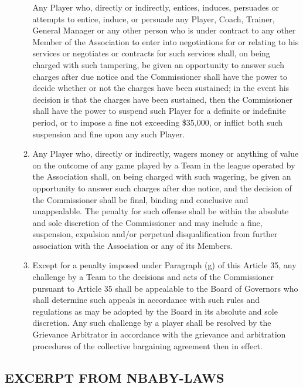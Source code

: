\documentclass[
]{book}
\begin{document}
\begin{enumerate}
\begin{enumerate}
    Any Player who, directly or indirectly, entices, induces, persuades or attempts to entice, induce, or persuade any Player, Coach, Trainer, General Manager or any other person who is under contract to any other Member of the Association to enter into negotiations for or relating to his services or negotiates or contracts for such services shall, on being charged with such tampering, be given an opportunity to answer such charges after due notice and the Commissioner shall have the power to decide whether or not the charges have been sustained; in the event his decision is that the charges have been sustained, then the Commissioner shall have the power to suspend such Player for a definite or indefinite period, or to impose a fine not exceeding \$35,000, or inflict both such suspension and fine upon any such Player.
  \item
    Any Player who, directly or indirectly, wagers money or anything of value on the outcome of any game played by a Team in the league operated by the Association shall, on being charged with such wagering, be given an opportunity to answer such charges after due notice, and the decision of the Commissioner shall be final, binding and conclusive and unappealable. The penalty for such offense shall be within the absolute and sole discretion of the Commissioner and may include a fine, suspension, expulsion and/or perpetual disqualification from further association with the Association or any of its Members.
  \item
    Except for a penalty imposed under Paragraph (g) of this Article 35, any challenge by a Team to the decisions and acts of the Commissioner pursuant to Article 35 shall be appealable to the Board of Governors who shall determine such appeals in accordance with such rules and regulations as may be adopted by the Board in its absolute and sole discretion. Any such challenge by a player shall be resolved by the Grievance Arbitrator in accordance with the grievance and arbitration procedures of the collective bargaining agreement then in effect.
  \end{enumerate}
\end{enumerate}

\newpage

\hypertarget{excerpt-from-nbaby-laws}{%
\subsection{EXCERPT FROM NBABY-LAWS}\label{excerpt-from-nbaby-laws}}
\end{document}
